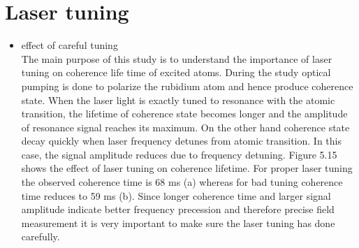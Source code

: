 \documentclass[12pt]{report}
\begin{document}
   \section{Laser tuning} 
   \begin{itemize}
   \item effect of careful tuning\\
	The main purpose of this study is to understand the importance of laser tuning on coherence life time of excited atoms. During the study optical pumping is done to polarize the rubidium atom and hence produce coherence state. When the laser light  is  exactly tuned to resonance with the atomic transition, the lifetime of coherence state becomes longer and the amplitude of resonance signal reaches its maximum. On the other hand coherence state decay  quickly when laser frequency detunes from atomic transition. In this case, the signal amplitude reduces due to frequency detuning. Figure 5.15 shows the effect of laser tuning on coherence lifetime. For proper laser tuning the observed coherence time is 68 ms (a) whereas for bad tuning coherence time reduces to 59 ms (b). Since  longer coherence time and larger signal amplitude indicate better frequency precession and therefore precise field measurement it is very important to make sure the laser tuning has done carefully.
   \begin{figure}
    \centering
 

\end{figure}
\end{itemize}
\end{document}
